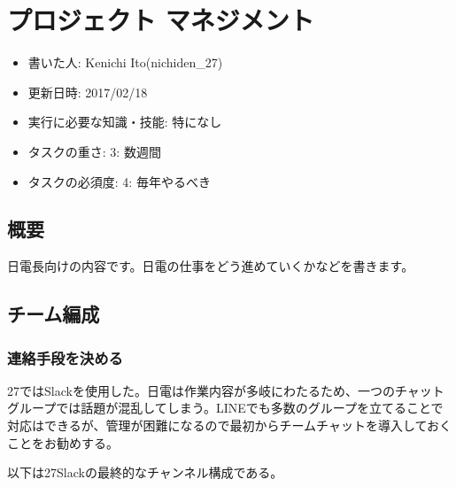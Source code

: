 \documentclass[letterpaper,10pt,dvipdfmx]{sphinxmanual}
\begin{document}
\chapter{プロジェクト マネジメント}
\label{\detokenize{management:}}\label{\detokenize{management::doc}}\label{\detokenize{management:id1}}\begin{itemize}
\item {} 
書いた人: Kenichi Ito(nichiden\_27)

\item {} 
更新日時: 2017/02/18

\item {} 
実行に必要な知識・技能: 特になし

\item {} 
タスクの重さ: 3: 数週間

\item {} 
タスクの必須度: 4: 毎年やるべき

\end{itemize}


\section{概要}
\label{\detokenize{management:}}\label{\detokenize{management:id2}}
日電長向けの内容です。日電の仕事をどう進めていくかなどを書きます。


\section{チーム編成}
\label{\detokenize{management:}}\label{\detokenize{management:id3}}

\subsection{連絡手段を決める}
\label{\detokenize{management:}}\label{\detokenize{management:id4}}
27ではSlackを使用した。日電は作業内容が多岐にわたるため、一つのチャットグループでは話題が混乱してしまう。LINEでも多数のグループを立てることで対応はできるが、管理が困難になるので最初からチームチャットを導入しておくことをお勧めする。

以下は27Slackの最終的なチャンネル構成である。

\begin{sphinxVerbatim}[commandchars=\\\{\}]
\end{sphinxVerbatim}
\end{document}
